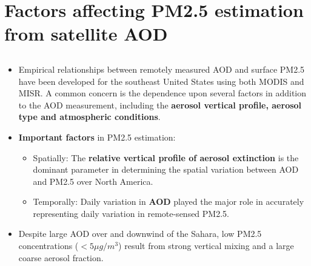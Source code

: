 \documentclass[11pt]{article}
\begin{document}

\section{Factors affecting PM2.5 estimation from satellite AOD}

\subsection{\citet{van2006estimating}}
\begin{itemize}
    \item Empirical relationships between remotely measured AOD and surface PM2.5 have been developed for the southeast United States using both MODIS and MISR. A common concern is the dependence upon several factors in addition to the AOD measurement, including the \textbf{aerosol vertical profile, aerosol type and atmospheric conditions}. 
    \item \textbf{Important factors} in PM2.5 estimation:  
        \begin{itemize}
            \item Spatially: The \textbf{relative vertical profile of aerosol extinction} is the dominant parameter in determining the spatial variation between AOD and PM2.5 over North America. 
            \item Temporally: Daily variation in \textbf{AOD} played the major role in accurately representing daily variation in remote-sensed PM2.5. 
        \end{itemize}
    \item Despite large AOD over and downwind of the Sahara, low PM2.5 concentrations ($< 5 \mu g/m^3$) result from strong vertical mixing and a large coarse aerosol fraction.
\end{itemize}
\end{document}
